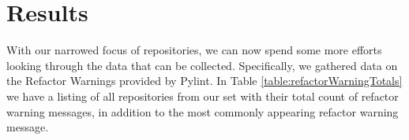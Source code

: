 \chapter{Results} \label{chapterResults}



With our narrowed focus of repositories, we can now spend some more efforts looking through the data that can be collected. Specifically, we gathered data on the Refactor Warnings provided by Pylint. In Table \ref{table:refactorWarningTotals} we have a listing of all repositories from our set with their total count of refactor warning messages, in addition to the most commonly appearing refactor warning message.

